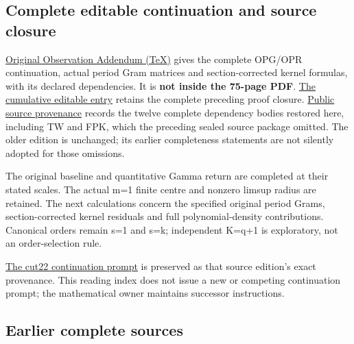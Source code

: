 \documentclass[
]{article}
\begin{document}
\subsection{Complete editable continuation and source
closure}\label{complete-editable-continuation-and-source-closure}

\href{https://github.com/KokunoYumeto/zeta-function-research-reader/tree/1c8ec52c85c173adc9f8403a8a26914955e2f5a9/workbenches/splitzero-tandem/continuations/20260914-original-volumes/next_original_observation/Original_Observation_Addendum.tex}{Original
Observation Addendum (TeX)} gives the complete OPG/OPR continuation,
actual period Gram matrices and section-corrected kernel formulas, with
its declared dependencies. It is \textbf{not inside the 75-page PDF}.
\href{https://github.com/KokunoYumeto/zeta-function-research-reader/tree/1c8ec52c85c173adc9f8403a8a26914955e2f5a9/workbenches/splitzero-tandem/continuations/20260914-original-volumes/Cumulative_Original_Gamma_Proofs.tex}{The
cumulative editable entry} retains the complete preceding proof closure.
\href{https://github.com/KokunoYumeto/zeta-function-research-reader/tree/1c8ec52c85c173adc9f8403a8a26914955e2f5a9/workbenches/splitzero-tandem/continuations/20260914-original-volumes/PUBLIC_DERIVATION.json}{Public
source provenance} records the twelve complete dependency bodies
restored here, including TW and FPK, which the preceding sealed source
package omitted. The older edition is unchanged; its earlier
completeness statements are not silently adopted for those omissions.

The original baseline and quantitative Gamma return are completed at
their stated scales. The actual m=1 finite centre and nonzero limsup
radius are retained. The next calculations concern the specified
original period Grams, section-corrected kernel residuals and full
polynomial-density contributions. Canonical orders remain s=1 and s=k;
independent K=q+1 is exploratory, not an order-selection rule.

\href{https://github.com/KokunoYumeto/zeta-function-research-reader/tree/1c8ec52c85c173adc9f8403a8a26914955e2f5a9/workbenches/splitzero-tandem/continuations/20260914-original-volumes/00_CONTINUE_THE_PROGRAMME.md}{The
cut22 continuation prompt} is preserved as that source edition's exact
provenance. This reading index does not issue a new or competing
continuation prompt; the mathematical owner maintains successor
instructions.

\subsection{Earlier complete sources}\label{earlier-complete-sources}
\end{document}
